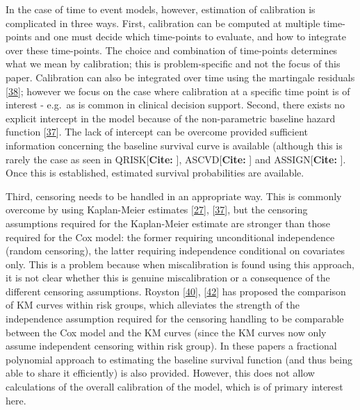\documentclass[12pt,PhD,twoside,openright]{muthesis}
\begin{document}
In the case of time to event models, however, estimation of calibration is complicated in three ways. First, calibration can be computed at multiple time-points and one must decide which time-points to evaluate, and how to integrate over these time-points. The choice and combination of time-points determines what we mean by calibration; this is problem-specific and not the focus of this paper. Calibration can also be integrated over time using the martingale residuals {[}\protect\hyperlink{ref-crowson_assessing_2016}{38}{]}; however we focus on the case where calibration at a specific time point is of interest - e.g.~as is common in clinical decision support. Second, there exists no explicit intercept in the model because of the non-parametric baseline hazard function {[}\protect\hyperlink{ref-royston_external_2013}{37}{]}. The lack of intercept can be overcome provided sufficient information concerning the baseline survival curve is available (although this is rarely the case as seen in QRISK{[}\textbf{Cite: }{]}, ASCVD{[}\textbf{Cite: }{]} and ASSIGN{[}\textbf{Cite: }{]}. Once this is established, estimated survival probabilities are available.

Third, censoring needs to be handled in an appropriate way. This is commonly overcome by using Kaplan-Meier estimates {[}\protect\hyperlink{ref-hippisley-cox_derivation_2007}{27}{]}, {[}\protect\hyperlink{ref-royston_external_2013}{37}{]}, but the censoring assumptions required for the Kaplan-Meier estimate are stronger than those required for the Cox model: the former requiring unconditional independence (random censoring), the latter requiring independence conditional on covariates only. This is a problem because when miscalibration is found using this approach, it is not clear whether this is genuine miscalibration or a consequence of the different censoring assumptions. Royston {[}\protect\hyperlink{ref-royston_tools_2014}{40}{]}, {[}\protect\hyperlink{ref-royston_tools_2015}{42}{]} has proposed the comparison of KM curves within risk groups, which alleviates the strength of the independence assumption required for the censoring handling to be comparable between the Cox model and the KM curves (since the KM curves now only assume independent censoring within risk group). In these papers a fractional polynomial approach to estimating the baseline survival function (and thus being able to share it efficiently) is also provided. However, this does not allow calculations of the overall calibration of the model, which is of primary interest here.
\end{document}
